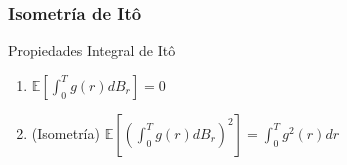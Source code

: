 \begin{frame}
  \frametitle{Isometría de It\^{o}}
	\hypertarget{thm:Isometria}{}    	
	\begin{block}{Propiedades Integral de It\^{o}}
		\begin{enumerate}		
		\item
			$\displaystyle		
				\mathbb{E}
				\left[
					\int_0^T g(r)dB_r
				\right]=0
			$
		\item(Isometr\'ia)
			$\displaystyle		
				\mathbb{E}
				\left[
					\left(
						\int_0^T g(r)dB_r					
					\right)^2		
				\right]=
				\int_0^T g^2(r)d	r		
			$
		\end{enumerate}	
	\end{block}	
	\hyperlink{prb:ConsistenciaISO}{}  
\end{frame}